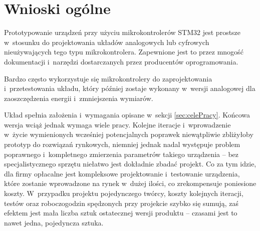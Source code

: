 \section{Wnioski ogólne}
Prototypowanie urządzeń przy użyciu mikrokontrolerów STM32 jest prostsze w~stosunku do projektowania układów analogowych lub cyfrowych nieużywających tego typu mikrokontrolera. Zapewnione jest to przez mnogość dokumentacji i~narzędzi dostarczanych przez producentów oprogramowania.

Bardzo często wykorzystuje się mikrokontrolery do zaprojektowania i~przetestowania układu, który później zostaje wykonany w~wersji analogowej dla zaoszczędzenia energii i~zmniejszenia wymiarów.

Układ spełnia założenia i~wymagania opisane w~sekcji \ref{sec:celePracy}. Końcowa wersja wciąż jednak wymaga wiele pracy. Kolejne iteracje i~wprowadzenie w~życie wymienionych wcześniej potencjalnych poprawek niewątpliwie zbliżyłoby prototyp do rozwiązań rynkowych, niemniej jednak nadal występuje problem poprawnego i~kompletnego zmierzenia parametrów takiego urządzenia -- bez specjalistycznego sprzętu niełatwo jest dokładnie zbadać projekt. Co za tym idzie, dla firmy opłacalne jest kompleksowe projektowanie i~testowanie urządzenia, które zostanie wprowadzone na rynek w~dużej ilości, co zrekompensuje poniesione koszty. W~przypadku projektu pojedynczego twórcy, koszty kolejnych iteracji, testów oraz roboczogodzin spędzonych przy projekcie szybko się sumują, zaś efektem jest mała liczba sztuk ostatecznej wersji produktu -- czasami jest to nawet jedna, pojedyncza sztuka. 